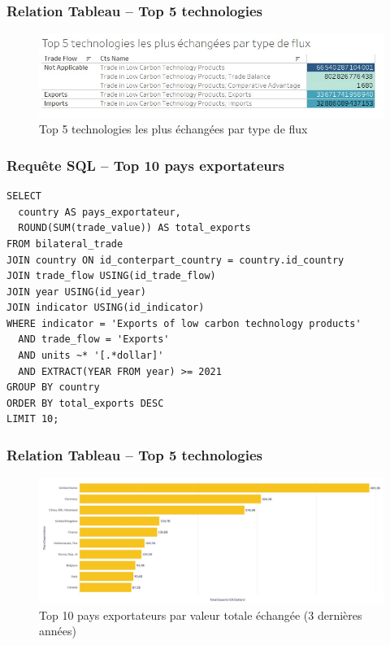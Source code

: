 \documentclass[11pt]{beamer}
\begin{document}
\begin{frame}[fragile]
  \frametitle{Relation Tableau – Top 5 technologies}
  \begin{figure}
    \centering
    \includegraphics[width=1\linewidth]{./Images/Top_5_technologies_les_plus_échangées_par_type_de_flux}
    \caption{Top 5 technologies les plus échangées par type de flux}
  \end{figure}
\end{frame}

\begin{frame}[fragile]
  \frametitle{Requête SQL – Top 10 pays exportateurs}
  \begin{lstlisting}[style=sqlStyle, caption={Requête SQL pour Top 10 pays exportateurs}]
SELECT 
  country AS pays_exportateur,
  ROUND(SUM(trade_value)) AS total_exports
FROM bilateral_trade
JOIN country ON id_conterpart_country = country.id_country
JOIN trade_flow USING(id_trade_flow)
JOIN year USING(id_year)
JOIN indicator USING(id_indicator)
WHERE indicator = 'Exports of low carbon technology products'
  AND trade_flow = 'Exports'
  AND units ~* '[.*dollar]'
  AND EXTRACT(YEAR FROM year) >= 2021
GROUP BY country
ORDER BY total_exports DESC
LIMIT 10;
  \end{lstlisting}
\end{frame}

\begin{frame}[fragile]
  \frametitle{Relation Tableau – Top 5 technologies}
  \begin{figure}
    \centering
    \includegraphics[width=1\linewidth]{./Images/Top_pays_exportateurs_par_valeur_totale_échangée_(3_dernières_années)}
    \caption{Top 10 pays exportateurs par valeur totale échangée (3 dernières années)}
  \end{figure}
\end{frame}
\end{document}
